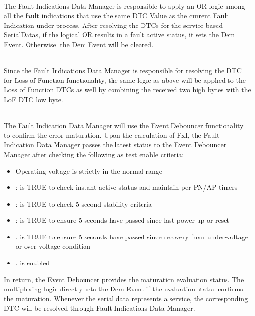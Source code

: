 \\
The Fault Indications Data Manager is responsible to apply an OR logic among all the fault indications that use the same DTC Value as the current Fault Indication under process. 
After resolving the DTCs for the service based SerialDatas, if the logical OR results in a fault active status, it sets the Dem Event. Otherwise, the Dem Event will be cleared.
\\
{   }

\\
Since the Fault Indications Data Manager is responsible for resolving the DTC for Loss of Function functionality,
the same logic as above will be applied to the Loss of Function DTCs as well 
by combining the received two high bytes with the LoF DTC low byte.
\\
{}

\\
The Fault Indication Data Manager will use the Event Debouncer functionality to confirm the error maturation. Upon the calculation of FxI,
the Fault Indication Data Manager passes the latest status to the Event Debouncer Manager after checking the following as test enable criteria:
\begin{itemize}
    \item  Operating voltage is strictly in the normal range
    \item {}: is TRUE to check instant active status and maintain per-PN/AP timers
    \item {}: is TRUE to check 5-second stability criteria
    \item {}: is TRUE to ensure 5 seconds have passed since last power-up or reset
    \item {}: is TRUE to ensure 5 seconds have passed since recovery from under-voltage or over-voltage condition
    \item {}: is enabled
\end{itemize}
In return, the Event Debouncer provides the maturation 
evaluation status. The multiplexing logic directly sets the Dem Event if the evaluation status confirms the maturation. Whenever the serial data represents
a service, the corresponding DTC will be resolved through Fault Indications Data Manager.  

